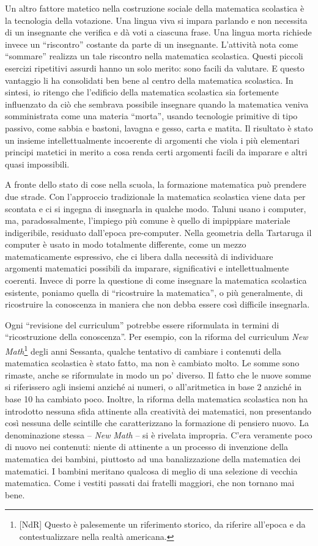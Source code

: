 Un altro fattore matetico nella costruzione sociale della matematica scolastica è la tecnologia della votazione. Una lingua viva si impara parlando e non necessita di un insegnante che verifica e dà voti a ciascuna frase. Una lingua morta richiede invece un “riscontro” costante da parte di un insegnante. L'attività nota come “sommare” realizza un tale riscontro nella matematica scolastica. Questi piccoli esercizi ripetitivi assurdi hanno un solo merito: sono facili da valutare. E questo vantaggio li ha consolidati ben bene al centro della matematica scolastica. In sintesi, io ritengo che l'edificio della matematica scolastica sia fortemente influenzato da ciò che sembrava possibile insegnare quando la matematica veniva somministrata come una materia “morta”, usando tecnologie primitive di  tipo passivo, come sabbia e bastoni, lavagna e gesso, carta e matita. Il risultato è stato un insieme intellettualmente incoerente di argomenti che viola i più elementari  principi matetici in merito a cosa renda certi argomenti facili da imparare e altri quasi impossibili. 

A fronte dello stato di cose nella scuola, la formazione matematica può prendere due strade. Con l'approccio tradizionale la matematica scolastica viene data per scontata e ci si ingegna di insegnarla in qualche modo. Taluni usano i computer, ma, paradossalmente, l'impiego più comune è quello di impippiare materiale indigeribile, residuato dall'epoca pre-computer. Nella geometria della Tartaruga  il computer è usato in modo totalmente differente, come un mezzo matematicamente espressivo, che ci libera dalla necessità di individuare argomenti matematici possibili da imparare, significativi e intellettualmente coerenti. Invece di porre la questione di come insegnare la matematica scolastica esistente, poniamo quella di “ricostruire la matematica”, o più generalmente, di ricostruire la conoscenza in maniera che non debba essere così difficile insegnarla. 

Ogni “revisione del curriculum” potrebbe essere riformulata in termini di “ricostruzione della conoscenza”. Per esempio, con la riforma del curriculum \textit{New Math}\footnote{[NdR] Questo è palesemente un riferimento storico, da riferire all'epoca e da contestualizzare nella realtà americana.} degli anni Sessanta, qualche tentativo di cambiare i contenuti della matematica scolastica è stato fatto, ma non è cambiato molto. Le somme sono rimaste, anche se riformulate in modo un po' diverso. Il fatto che  le nuove somme si riferissero agli insiemi anziché ai numeri, o all'aritmetica in base 2 anziché in base 10 ha cambiato poco. Inoltre, la riforma della matematica scolastica non ha introdotto nessuna sfida attinente alla creatività dei matematici, non presentando così nessuna delle scintille che caratterizzano la formazione di pensiero nuovo. La denominazione stessa – \textit{New} \textit{Math} – si è rivelata impropria. C'era veramente poco di nuovo nei contenuti: niente di attinente a un processo di invenzione della matematica dei bambini, piuttosto ad una banalizzazione della matematica dei matematici. I bambini meritano qualcosa di meglio di una selezione di vecchia matematica. Come i vestiti passati dai fratelli maggiori, che non tornano mai bene. 

